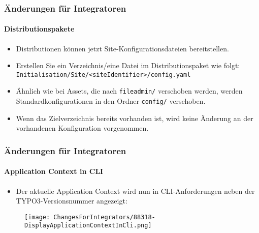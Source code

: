 
\begin{frame}[fragile]
	\frametitle{Änderungen für Integratoren}
	\framesubtitle{Distributionspakete}

	\lstset{basicstyle=\tiny\ttfamily}

	\begin{itemize}
		\item Distributionen können jetzt Site-Konfigurationsdateien bereitstellen.

		\item Erstellen Sie ein Verzeichnis/eine Datei im Distributionspaket wie folgt:\newline
			\texttt{Initialisation/Site/<siteIdentifier>/config.yaml}

		\item Ähnlich wie bei Assets, die nach \texttt{fileadmin/} verschoben werden,\newline
			werden Standardkonfigurationen in den Ordner \texttt{config/} verschoben.

		\item Wenn das Zielverzeichnis bereits vorhanden ist, wird keine Änderung an der vorhandenen Konfiguration vorgenommen.
	\end{itemize}

\end{frame}


\begin{frame}[fragile]
	\frametitle{Änderungen für Integratoren}
	\framesubtitle{Application Context in CLI}

	\begin{itemize}
		\item Der aktuelle Application Context wird nun in CLI-Anforderungen neben der 
			TYPO3-Versionsnummer angezeigt:
	\end{itemize}

	\begin{figure}
		\texttt{[image: ChangesForIntegrators/88318-DisplayApplicationContextInCli.png]}
	\end{figure}

\end{frame}

